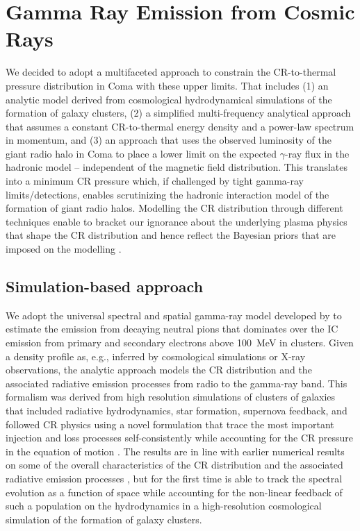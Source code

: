\documentclass[12pt,manuscript]{aastex}
\begin{document}
\section{Gamma Ray Emission from Cosmic Rays}
We decided to adopt a multifaceted approach to constrain the CR-to-thermal
pressure distribution in Coma with these upper limits. That includes (1) an
analytic model derived from cosmological hydrodynamical simulations of the
formation of galaxy clusters, (2) a simplified multi-frequency analytical
approach that assumes a constant CR-to-thermal energy density and a power-law
spectrum in momentum, and (3) an approach that uses the observed luminosity of
the giant radio halo in Coma to place a lower limit on the expected $\gamma$-ray
flux in the hadronic model -- independent of the magnetic field distribution.
This translates into a minimum CR pressure which, if challenged by tight
gamma-ray limits/detections, enables scrutinizing the hadronic interaction model
of the formation of giant radio halos.  Modelling the CR distribution through
different techniques enable to bracket our ignorance about the underlying plasma
physics that shape the CR distribution and hence reflect the Bayesian priors
that are imposed on the modelling \citep[see][for a
discussion]{article:PinzkePfrommerBergstrom}.

\subsection{Simulation-based approach}
We adopt the universal spectral and spatial gamma-ray model developed by
\citet{article:PinzkePfrommer:2010} to estimate the emission from decaying neutral pions
that dominates over the IC emission from primary and secondary electrons above
100~MeV in clusters. Given a density profile as, e.g., inferred by cosmological
simulations or X-ray observations, the analytic approach models the CR
distribution and the associated radiative emission processes from radio to the
gamma-ray band.  This formalism was derived from high resolution simulations of
clusters of galaxies that included radiative hydrodynamics, star formation,
supernova feedback, and followed CR physics using a novel formulation that trace
the most important injection and loss processes self-consistently while
accounting for the CR pressure in the equation of motion
\citep{article:PfrommerSpringelEnsslinJubelgas, article:EnsslinPfrommerSpringelJubelgas:2007, article:JubelgasSpringelEnsslinPfrommer:2008}.  The
results are in line with earlier numerical results on some of the overall
characteristics of the CR distribution and the associated radiative emission
processes \citep{article:DolagEnsslin, article:MiniatiRyuKangJones:2001, article:Miniati:2003, article:Pfrommer_etal:2007, article:PfrommerEnsslinSpringel:2008, article:Pfrommer:2008}, but for the
first time is able to track the spectral evolution as a function of space while
accounting for the non-linear feedback of such a population on the hydrodynamics
in a high-resolution cosmological simulation of the formation of galaxy
clusters.
 
\end{document}
